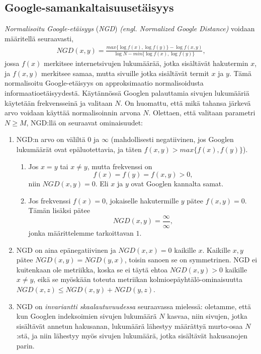 \documentclass[12pt,finnish,final]{tktltiki2}
\theoremstyle{definition}
\theoremstyle{remark}
\newcommand{\engl}[1]{\emph{(engl. #1)}}
\begin{document}
    \subsection{Google-samankaltaisuusetäisyys} %
    \label{sub:google_samankaltaisuusetaisyys}
      \emph{Normalisoitu Google-etäisyys} (\emph{NGD}) \engl{Normalized Google Distance}  voidaan määritellä seuraavasti,
      \begin{align}
        NGD(x,y) = \frac{max\{\log{f(x)},\log{f(y)}\}-\log{f(x,y)}}{\log{N}-min\{\log{f(x)},\log{f(y)}\}},
      \end{align}
      jossa $f(x)$ merkitsee internetsivujen lukumäärää, jotka sisältävät hakutermin $x$, ja $f(x,y)$ merkitsee samaa, mutta sivuille jotka sisältävät termit $x$ ja $y$.
      Tämä normalisoitu Google-etäisyys on approksimaatio normalisoidusta informaatioetäisyydestä.
      Käytännössä Googlen palauttamia sivujen lukumääriä käytetään frekvensseinä ja valitaan $N$.
      On huomattu, että mikä tahansa järkevä arvo voidaan käyttää normalisoinnin arvona $N$.
     Olettaen, että valitaan parametri $N\geq{}M$, NGD:llä on seuraavat ominaisuudet:
      \begin{enumerate}
        \item NGD:n arvo on väliltä $0$ ja $\infty$ (mahdollisesti negatiivinen, jos Googlen lukumäärät ovat epäluotettavia, ja täten $f(x,y) > max\{f(x),f(y)\}$).
        \begin{enumerate}
          \item Jos $x=y$ tai $x\neq{}y$, mutta frekvenssi on
          \[
            f(x) = f(y) = f(x,y) > 0,
          \]
          niin $NGD(x,y)=0$. Eli $x$ ja $y$ ovat Googlen kannalta samat.
          \item Jos frekvenssi $f(x)=0$, jokaiselle hakutermille $y$ pätee $f(x,y)=0$. Tämän lisäksi pätee
          \[
            NGD(x,y)=\frac{\infty}{\infty},
          \]
          jonka määrittelemme tarkoittavan $1$.
        \end{enumerate}
        \item NGD on aina epänegatiivinen ja $NGD(x,x)=0$ kaikille $x$. Kaikille $x,y$ pätee $NGD(x,y)=NGD(y,x)$, toisin sanoen se on symmetrinen. NGD ei kuitenkaan ole metriikka, koska se ei täytä ehtoa $NGD(x,y) > 0$ kaikille $x\neq{}y$, eikä se myöskään toteuta metriikan kolmioepäyhtälö-ominaisuutta $NGD(x,z) \leq NGD(x,y) + NGD(y,z)$. \cite{cilibrasi2007google}
        \item NGD on \emph{invariantti skaalautuvuudessa} seuraavassa mielessä: oletamme, että kun Googlen indeksoimien sivujen lukumäärä $N$ kasvaa, niin sivujen, jotka sisältävät annetun hakusanan, lukumäärä lähestyy määrättyä murto-osaa $N$:stä, ja niin lähestyy myös sivujen lukumäärä, jotka sisältävät hakusanojen parin.
      \end{enumerate}
\end{document}
